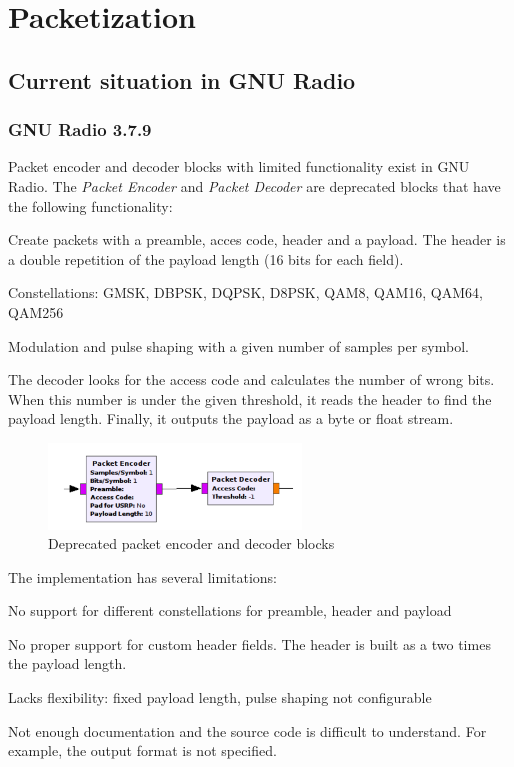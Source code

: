 \section{Packetization}

\subsection{Current situation in GNU Radio}
\subsubsection{GNU Radio 3.7.9}

Packet encoder and decoder blocks with limited functionality exist in GNU Radio. The \textit{Packet Encoder} and \textit{Packet Decoder} are deprecated blocks that have the following functionality:
\begin{tight_itemize}
\item Create packets with a preamble, acces code, header and a payload. The header is a double repetition of the payload length (16 bits for each field).
\item Constellations: GMSK, DBPSK, DQPSK, D8PSK, QAM8, QAM16, QAM64, QAM256
\item Modulation and pulse shaping with a given number of samples per symbol.
\end{tight_itemize}

The decoder looks for the access code and calculates the number of wrong bits. When this number is under the given threshold, it reads the header to find the payload length. Finally, it outputs the payload as a byte or float stream.

\begin{figure}[H]
    \centering
    \includegraphics[width=0.6\textwidth]{img_packets/packet_encdec.png}
    \caption{Deprecated packet encoder and decoder blocks}
    \label{fig:packet_encdec}
\end{figure}

The implementation has several limitations:
\begin{tight_itemize}
\item No support for different constellations for preamble, header and payload
\item No proper support for custom header fields. The header is built as a two times the payload length.
\item Lacks flexibility: fixed payload length, pulse shaping not configurable
\item Not enough documentation and the source code is difficult to understand. For example, the output format is not specified.
\end{tight_itemize}

